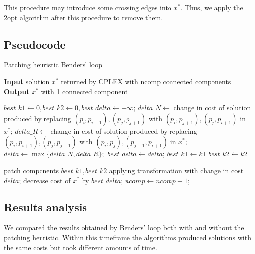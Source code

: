 This procedure may introduce some crossing edges into $x^*$. Thus, we apply the 2opt algorithm after this procedure to remove them.

\newpage
\subsection{Pseudocode}
\begin{algorithm}[h]
    \caption{Patching heuristic Benders' loop}
    \textbf{Input} solution $x^*$ returned by CPLEX with ncomp connected components\\
    \textbf{Output} $x^*$ with 1 connected component\\
    \begin{algorithmic}

        \State $best\_k1\gets0, best\_k2\gets0, best\_delta\gets-\infty$;
        \State $delta\_N\gets$ change in cost of solution produced by replacing
        \State $(p_i,p_{i+1}), (p_j,p_{j+1})$ with $(p_i,p_{j+1}), (p_j,p_{i+1})$ in $x^*$;
        \State $delta\_R\gets$ change in cost of solution produced by replacing
        \State $(p_i,p_{i+1}), (p_j,p_{j+1})$ with $(p_i,p_j), (p_{j+1},p_{i+1})$ in $x^*$;
        \State $delta\gets\max\{delta\_N,delta\_R\};$
        \State $best\_delta \gets delta$;
        \State $best\_k1\gets k1$
        \State $best\_k2\gets k2$
        \EndIf
        \EndFor
        \EndFor

        \State patch components $best\_k1,best\_k2$ applying transformation with change in cost
        \State $delta$;
        \State decrease cost of $x^*$ by $best\_delta$;
        \State $ncomp \gets ncomp-1$;
        \EndWhile
    \end{algorithmic}
    
\end{algorithm}

\subsection{Results analysis}

We compared the results obtained by Benders' loop both with and without the patching heuristic. Within this timeframe the algorithms produced solutions with the same costs but took different amounts of time.

